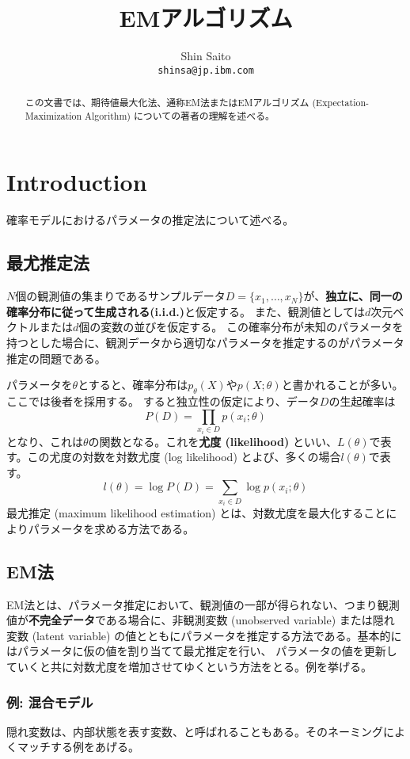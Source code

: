 \documentclass[draft]{jsarticle}
\begin{document}
\title{EMアルゴリズム}
\author{Shin Saito\\ \texttt{shinsa@jp.ibm.com}}
\maketitle
\begin{abstract}
この文書では、期待値最大化法、通称EM法またはEMアルゴリズム (Expectation-Maximization Algorithm)
についての著者の理解を述べる。
\end{abstract}
\section{Introduction}
確率モデルにおけるパラメータの推定法について述べる。
\subsection{最尤推定法}
$N$個の観測値の集まりであるサンプルデータ$D=\{x_1,
\ldots,x_N\}$が、\textbf{独立に、同一の確率分布に従って生成される(i.i.d.)}と仮定する。
また、観測値としては$d$次元ベクトルまたは$d$個の変数の並びを仮定する。
この確率分布が未知のパラメータを持つとした場合に、観測データから適切なパラメータを推定するのがパラメータ推定の問題である。

パラメータを$\theta$とすると、確率分布は$p_\theta(X)$や$p(X;\theta)$と書かれることが多い。ここでは後者を採用する。
すると独立性の仮定により、データ$D$の生起確率は
\[ P(D)= \prod_{x_i\in D} p(x_i;\theta) \]
となり、これは$\theta$の関数となる。これを\textbf{尤度 (likelihood)}
といい、$L(\theta)$で表す。この尤度の対数を対数尤度 (log likelihood) とよび、多くの場合$l(\theta)$で表す。
\[ l(\theta) = \log P(D)= \sum_{x_i\in D} \log p(x_i;\theta) \]
最尤推定 (maximum likelihood estimation) とは、対数尤度を最大化することによりパラメータを求める方法である。

\subsection{EM法}
EM法とは、パラメータ推定において、観測値の一部が得られない、つまり観測値が\textbf{不完全データ}である場合に、非観測変数
(unobserved variable) または隠れ変数 (latent variable)
の値とともにパラメータを推定する方法である。基本的にはパラメータに仮の値を割り当てて最尤推定を行い、
パラメータの値を更新していくと共に対数尤度を増加させてゆくという方法をとる。例を挙げる。
\subsubsection{例: 混合モデル}
隠れ変数は、内部状態を表す変数、と呼ばれることもある。そのネーミングによくマッチする例をあげる。
\end{document}
